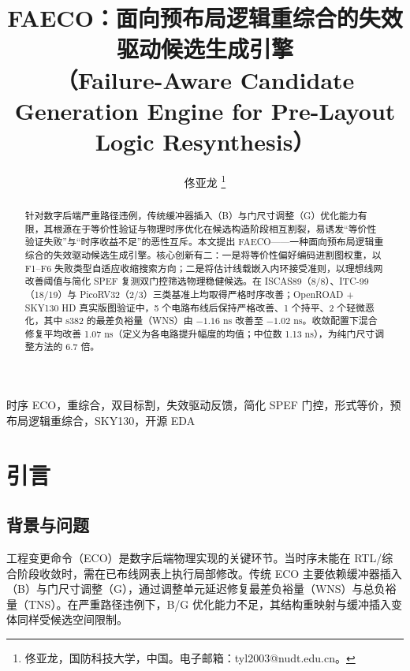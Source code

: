 \documentclass[journal]{IEEEtran}
\title{FAECO：面向预布局逻辑重综合的失效驱动候选生成引擎\\
（Failure-Aware Candidate Generation Engine for Pre-Layout Logic Resynthesis）}
\author{佟亚龙%
\thanks{佟亚龙，国防科技大学，中国。电子邮箱：tyl2003@nudt.edu.cn。}}
\begin{document}
\maketitle

\sloppy

\begin{abstract}
针对数字后端严重路径违例，传统缓冲器插入（B）与门尺寸调整（G）优化能力有限，其根源在于等价性验证与物理时序优化在候选构造阶段相互割裂，易诱发“等价性验证失败”与“时序收益不足”的恶性互斥。本文提出 FAECO——一种面向预布局逻辑重综合的失效驱动候选生成引擎。核心创新有二：一是将等价性偏好编码进割图权重，以 F1--F6 失败类型自适应收缩搜索方向；二是将估计线载嵌入内环接受准则，以理想线网改善阈值与简化 SPEF 复测双门控筛选物理稳健候选。在 ISCAS89（8/8）、ITC-99（18/19）与 PicoRV32（2/3）三类基准上均取得严格时序改善；OpenROAD + SKY130 HD 真实版图验证中，5 个电路布线后保持严格改善、1 个持平、2 个轻微恶化，其中 s382 的最差负裕量（WNS）由 $-1.16$ ns 改善至 $-1.02$ ns。收敛配置下混合修复平均改善 1.07 ns（定义为各电路提升幅度的均值；中位数 1.13 ns），为纯门尺寸调整方法的 6.7 倍。
\end{abstract}

\begin{IEEEkeywords}
时序 ECO，重综合，双目标割，失效驱动反馈，简化 SPEF 门控，形式等价，预布局逻辑重综合，SKY130，开源 EDA
\end{IEEEkeywords}

\section{引言}

\subsection{背景与问题}

工程变更命令（ECO）是数字后端物理实现的关键环节。当时序未能在 RTL/综合阶段收敛时，需在已布线网表上执行局部修改。传统 ECO 主要依赖缓冲器插入（B）与门尺寸调整（G），通过调整单元延迟修复最差负裕量（WNS）与总负裕量（TNS）。在严重路径违例下，B/G 优化能力不足，其结构重映射与缓冲插入变体同样受候选空间限制\cite{chen2012metal,chen2012fixability,liang2012buffer,ho2010eco}。
\end{document}
